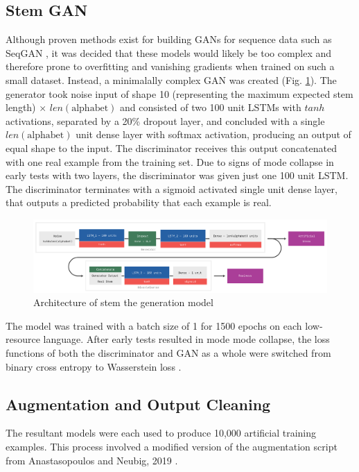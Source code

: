 \documentclass{article}
\begin{document}
    \subsection{Stem GAN}
      Although proven methods exist for building GANs for sequence data such as SeqGAN \cite{seqgan}, it was decided that these models would likely be too complex and therefore prone to overfitting and vanishing gradients when trained on such a small dataset. Instead, a minimalally complex GAN was created (Fig. \ref{fig:architecture}). The generator took noise input of shape 10 (representing the maximum expected stem length) $\times$ $len(\textrm{alphabet})$ and consisted of two 100 unit LSTMs with $tanh$ activations, separated by a 20\% dropout layer, and concluded with a single $len(\textrm{alphabet})$ unit dense layer with softmax activation, producing an output of equal shape to the input. The discriminator receives this output concatenated with one real example from the training set. Due to signs of mode collapse in early tests with two layers, the discriminator was given just one 100 unit LSTM. The discriminator terminates with a sigmoid activated single unit dense layer, that outputs a predicted probability that each example is real.

      \begin{figure}[H]
        \center
        \includegraphics[width=\linewidth]{architecture.pdf}
        \caption{Architecture of stem the generation model}
        \label{fig:architecture}
      \end{figure}

      The model was trained with a batch size of 1 for 1500 epochs on each low-resource language. After early tests resulted in mode mode collapse, the loss functions of both the discriminator and GAN as a whole were switched from binary cross entropy to Wasserstein loss \cite{wgan}.

    \subsection{Augmentation and Output Cleaning}
      The resultant models were each used to produce 10,000 artificial training examples. This process involved a modified version of the augmentation script from Anastasopoulos and Neubig, 2019 \cite{CMU}.
      
\end{document}
